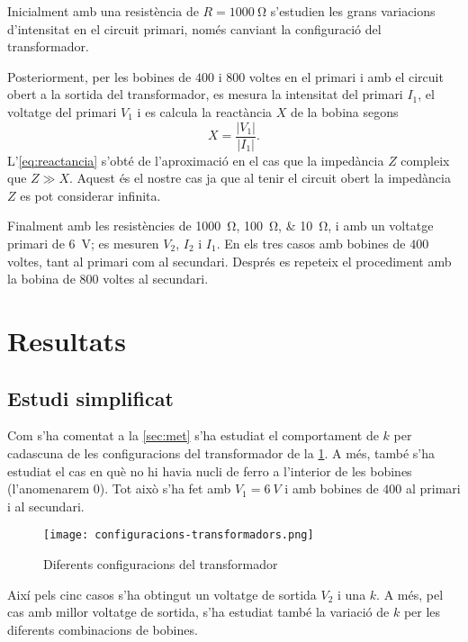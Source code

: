 Inicialment amb una resistència de $R= \SI{1000}{\ohm}$ s'estudien les grans variacions d'intensitat en el circuit primari, només canviant la configuració del transformador. 

Posteriorment, per les bobines de $400$ i $800$ voltes en el primari i amb el circuit obert a la sortida del transformador, es mesura  la intensitat del primari $I_1$, el voltatge del primari $V_1$ i es calcula la reactància $X$ de la bobina segons
\begin{equation}\label{eq:reactancia}
  X=\frac{|V_1|}{|I_1|}.
\end{equation}
L'\cref{eq:reactancia} s'obté de l'aproximació en el cas que la impedància $Z$ compleix que $Z \gg X$. Aquest és el nostre cas ja que al tenir el circuit obert la impedància $Z$ es pot considerar infinita. 

Finalment amb les resistències de \SIlist{1000;100;10}{\ohm}, i amb un voltatge primari de \SI{6}{V}; es mesuren $V_2$, $I_2$ i $I_1$. En els tres casos amb bobines de $400$ voltes, tant al primari com al secundari. Després es repeteix el procediment amb la bobina de $800$ voltes al secundari.

\section{Resultats}
\subsection{Estudi simplificat}
Com s'ha comentat a la \cref{sec:met} s'ha estudiat el comportament de $k$ per cadascuna de les configuracions del transformador de la \cref{fig:configuracions}.
A més, també s'ha estudiat el cas en què no hi havia nucli de ferro a l'interior de les bobines (l'anomenarem $0$). Tot això s'ha fet amb $V_1=\SI{6}{V}$ i amb bobines de $400$ al primari i al secundari.

\begin{figure}[htb]
  \centering \small \sffamily
  \texttt{[image: configuracions-transformadors.png]}
  \caption{Diferents configuracions del transformador}
  \label{fig:configuracions}
\end{figure}

Així pels cinc casos s'ha obtingut un voltatge de sortida $V_2$ i una $k$. A més, pel cas amb millor voltatge de sortida, s'ha estudiat també la variació de $k$ per les diferents combinacions de bobines.

